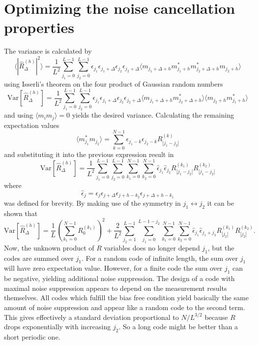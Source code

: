 \documentclass[18pt,a4paper]{extarticle}
\begin{document}
\section{Optimizing the noise cancellation properties}
The variance is calculated by
\begin{equation}
\langle |\hat{R}^{(h)}_\Delta|^2 \rangle = \frac{1}{L^2}\sum^{L-1}_{j_1=0}\sum^{L-1}_{j_2=0}
\epsilon_{j_1} \epsilon_{j_1 + \Delta}
\epsilon_{j_2} \epsilon_{j_2 + \Delta}
\langle
m_{j_1 + \Delta + h} m_{j_1 + h}^*
m_{j_2 + \Delta + h}^* m_{j_2 + h}
\rangle
\end{equation}
using Isserli's theorem on the four product of Gaussian random numbers
\begin{equation}
\mathrm{Var}[ \hat{R}^{(h)}_\Delta ] = \frac{1}{L^2}\sum^{L-1}_{j_1=0}\sum^{L-1}_{j_2=0}
\epsilon_{j_1} \epsilon_{j_1 + \Delta}
\epsilon_{j_2} \epsilon_{j_2 + \Delta}
\langle m_{j_1 + \Delta + h} m_{j_2 + \Delta + h}^* \rangle
\langle m_{j_2 + h} m_{j_1 + h}^* \rangle
\end{equation}
and using $\langle m_i m_j \rangle = 0$ yields the desired variance.
Calculating the remaining expectation values
\begin{equation}
\langle m_{j_1}^*m_{j_2} \rangle = \sum_{k=0}^{N-1} \epsilon_{j_1-k} \epsilon_{j_2-k} R_{|j_1-j_2|}^{(k)}
\end{equation}
and substituting it into the previous expression result in
\begin{equation}
\mathrm{Var}[ \hat{R}^{(h)}_\Delta ] = \frac{1}{L^2}\sum^{L-1}_{j_1=0}\sum^{L-1}_{j_2=0}\sum_{k_1=0}^{N-1}\sum_{k_2=0}^{N-1}
\hat{\epsilon}_{j_1}\hat{\epsilon}_{j_2} R_{|j_1-j_2|}^{(k_1)} R_{|j_1-j_2|}^{(k_2)}
\end{equation}
where
\begin{equation}
\hat{\epsilon}_j = \epsilon_j \epsilon_{j + \Delta} \epsilon_{j + h - k_2} \epsilon_{j + \Delta + h - k_1}
\end{equation}
was defined for brevity.
By making use of the symmetry in $j_1 \leftrightarrow j_2$ it can be shown that
\begin{equation}
\mathrm{Var}[ \hat{R}^{(h)}_\Delta ] = \frac{1}{L}\left(\sum_{k_1=0}^{N-1} R_{0}^{(k_1)} \right)^2 +
\frac{2}{L^2}\sum^{L-1}_{j_2=1}\sum^{L-1-j_2}_{j_1=0}\sum_{k_1=0}^{N-1}\sum_{k_2=0}^{N-1}
\hat{\epsilon}_{j_1}\hat{\epsilon}_{j_1+j_2} R_{|j_2|}^{(k_1)} R_{|j_2|}^{(k_2)}.
\end{equation}
Now, the unknown product of $R$ variables does no longer depend $j_1$, but the codes are summed over $j_1$.
For a random code of infinite length, the sum over $j_1$ will have zero expectation value.
However, for a finite code the sum over $j_1$ can be negative, yielding additional noise suppression.
The design of a code with maximal noise suppression appears to depend on the measurement results themselves.
All codes which fulfill the bias free condition yield basically the same amount of noise suppression and appear like a random code to the second term.
This gives effectively a standard deviation proportional to $N/L^{3/2}$ because $R$ drops exponentially with increasing $j_2$.
So a long code might be better than a short periodic one.
\end{document}
